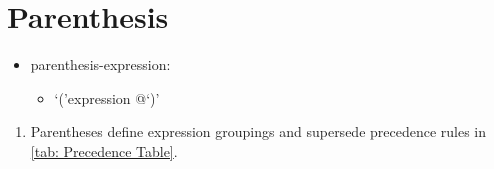 \section{Parenthesis}

\begin{itemize}[before=\itshape, label={}]
	\item parenthesis-expression:
	\begin{itemize}[before=\itshape, label={}]
		\item `('\lstinline@ expression @`)'
	\end{itemize}
\end{itemize}
\begin{enumerate}
	\item Parentheses define expression groupings and supersede precedence rules in \ref{tab: Precedence Table}.
\end{enumerate}
